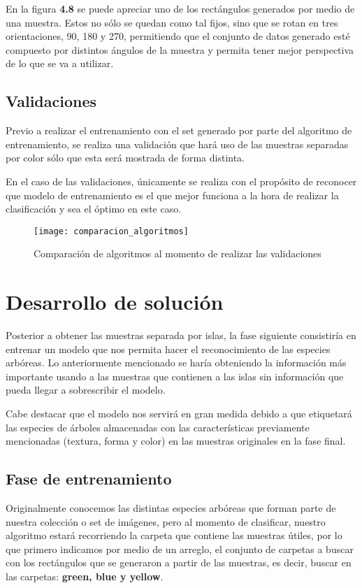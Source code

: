 En la figura \textbf{4.8} se puede apreciar uno de los rectángulos generados por medio de una muestra. Estos no sólo se quedan como tal fijos, sino que se rotan en tres orientaciones, 90, 180 y 270, permitiendo que el conjunto de datos generado esté compuesto por distintos ángulos de la muestra y permita tener mejor perspectiva de lo que se va a utilizar.

\break

\section{Validaciones}

Previo a realizar el entrenamiento con el set generado por parte del algoritmo de entrenamiento, se realiza una validación que hará uso de las muestras separadas por color sólo que esta será mostrada de forma distinta.

En el caso de las validaciones, únicamente se realiza con el propósito de reconocer que modelo de entrenamiento es el que mejor funciona a la hora de realizar la clasificación y sea el óptimo en este caso. \\


\begin{figure}[h]
 \centering
\texttt{[image: comparacion\_algoritmos]}
\caption{Comparación de algoritmos al momento de realizar las validaciones}
\end{figure}

\break

\chapter{Desarrollo de solución}

Posterior a obtener las muestras separada por islas, la fase siguiente consistiría en entrenar un modelo que nos permita hacer el reconocimiento de las especies arbóreas. Lo anteriormente mencionado se haría obteniendo la información más importante usando a las muestras que contienen a las islas sin información que pueda llegar a sobrescribir el modelo.

Cabe destacar que el modelo nos servirá en gran medida debido a que etiquetará las especies de árboles almacenadas con las características previamente mencionadas (textura, forma y color) en las muestras originales en la fase final.

\section{Fase de entrenamiento}
Originalmente conocemos las distintas especies arbóreas que forman parte de nuestra colección o set de imágenes, pero al momento de clasificar, nuestro algoritmo estará recorriendo la carpeta que contiene las muestras útiles, por lo que primero indicamos por medio de un arreglo, el conjunto de carpetas a buscar con los rectángulos que se generaron a partir de las muestras, es decir, buscar en las carpetas: \textbf{green, blue y yellow}. \\

